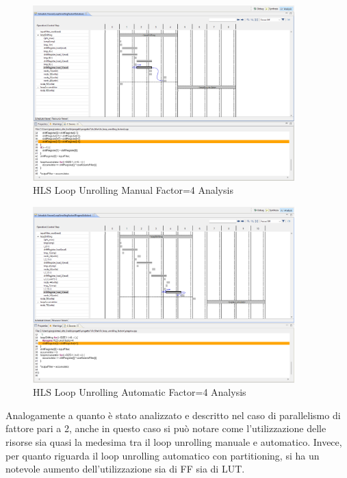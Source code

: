\begin{figure}[H]
    \centering
    \includegraphics[width=0.9\textwidth]{solutions/loop_unrolling/factor4/loopunrollingmanual4.png}
    \caption{HLS Loop Unrolling Manual Factor=4 Analysis}
\end{figure}

\begin{figure}[H]
    \centering
    \includegraphics[width=0.9\textwidth]{solutions/loop_unrolling/factor4/loopunrollingautomatic4.png}
    \caption{HLS Loop Unrolling Automatic Factor=4 Analysis}
\end{figure}

Analogamente a quanto è stato analizzato e descritto nel caso di parallelismo di fattore pari a 2, anche in questo caso si può notare come l'utilizzazione delle risorse sia quasi la medesima tra il loop unrolling manuale e automatico. Invece, per quanto riguarda il loop unrolling automatico con partitioning, si ha un notevole aumento dell'utilizzazione sia di FF sia di LUT.

